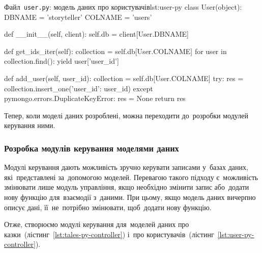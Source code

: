 \documentclass[
	a4paper,
	oneside,
	BCOR = 10mm,
	DIV = 12,
	12pt,
	headings = normal,
]{scrartcl}
\newcommand{\filename}[1]{\texttt{#1}}
\begin{document}
				\begin{listingpython}{Файл~\filename{\textenglish{user.py}}: модель даних про користувачів}{lst:user-py}
class User(object):
    DBNAME = 'storyteller'
    COLNAME = 'users'

    def __init__(self, client):
        self.db = client[User.DBNAME]

    def get_ids_iter(self):
        collection = self.db[User.COLNAME]
        for user in collection.find({}):
            yield user['user_id']

    def add_user(self, user_id):
        collection = self.db[User.COLNAME]
        try:
            res = collection.insert_one({'user_id': user_id})
        except pymongo.errors.DuplicateKeyError:
            res = None
        return res
				\end{listingpython}
				Тепер, коли моделі даних розроблені, можна переходити до~розробки модулей керування ними. 

			\subsubsection{Розробка модулів керування моделями даних}
				Модулі керування дають можливість зручно керувати записами у~базах даних, які~представлені за~допомогою моделей. Перевагою такого підходу є~можливість змінювати лише модуль управління, якщо необхідно змінити запис або~додати нову функцію для~взаємодії з~даними. При цьому, якщо модель даних вичерпно описує дані, її~не~потрібно змінювати, щоб~додати нову функцію.

				Отже, створюємо модулі керування для~моделей даних про казки~(лістинг~\ref{lst:tales-py-controller}) і~про користувачів~(лістинг~\ref{lst:user-py-controller}).
\end{document}
